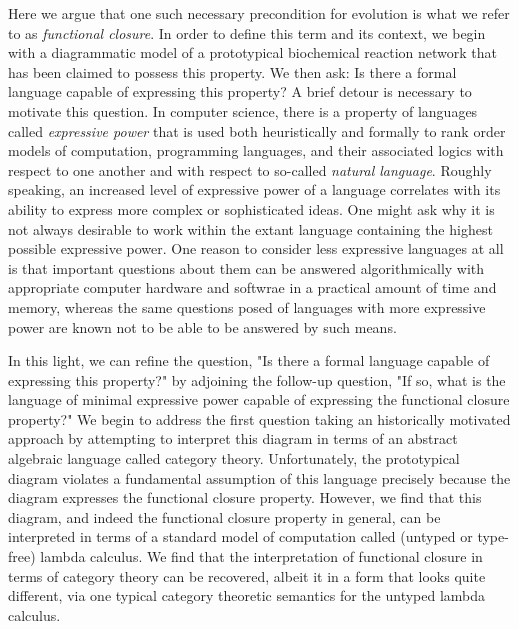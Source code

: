 \documentclass[10pt]{article}
\begin{document}
Here we argue that one such necessary precondition for evolution is what we refer to as \emph{functional closure}. In order to define this term and its context, we begin with a diagrammatic model of a prototypical biochemical reaction network that has been claimed to possess this property. We then ask: Is there a formal language capable of expressing this property? A brief detour is necessary to motivate this question. In computer science, there is a property of languages called \emph{expressive power} that is used both heuristically and formally to rank order models of computation, programming languages, and their associated logics with respect to one another and with respect to so-called \emph{natural language}. Roughly speaking, an increased level of expressive power of a language correlates with its ability to express more complex or sophisticated ideas. One might ask why it is not always desirable to work within the extant language containing the highest possible expressive power. One reason to consider less expressive languages at all is that important questions about them can be answered algorithmically with appropriate computer hardware and softwrae in a practical amount of time and memory, whereas the same questions posed of languages with more expressive power are known not to be able to be answered by such means.

In this light, we can refine the question, "Is there a formal language capable of expressing this property?" by adjoining the follow-up question, "If so, what is the language of minimal expressive power capable of expressing the functional closure property?" We begin to address the first question taking an historically motivated approach by attempting to interpret this diagram in terms of an abstract algebraic language called category theory. Unfortunately, the prototypical diagram violates a fundamental assumption of this language precisely because the diagram expresses the functional closure property. However, we find that this diagram, and indeed the functional closure property in general, can be interpreted in terms of a standard model of computation called (untyped or type-free) lambda calculus. We find that the interpretation of functional closure in terms of category theory can be recovered, albeit it in a form that looks quite different, via one typical category theoretic semantics for the untyped lambda calculus.
\end{document}
